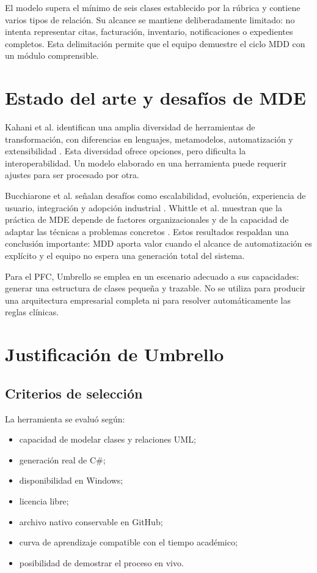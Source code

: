 El modelo supera el mínimo de seis clases establecido por la rúbrica y contiene varios tipos de relación. Su alcance se mantiene deliberadamente limitado: no intenta representar citas, facturación, inventario, notificaciones o expedientes completos. Esta delimitación permite que el equipo demuestre el ciclo MDD con un módulo comprensible.

\section{Estado del arte y desafíos de MDE}
Kahani et al. identifican una amplia diversidad de herramientas de transformación, con diferencias en lenguajes, metamodelos, automatización y extensibilidad \cite{Kahani2019}. Esta diversidad ofrece opciones, pero dificulta la interoperabilidad. Un modelo elaborado en una herramienta puede requerir ajustes para ser procesado por otra.

Bucchiarone et al. señalan desafíos como escalabilidad, evolución, experiencia de usuario, integración y adopción industrial \cite{Bucchiarone2020}. Whittle et al. muestran que la práctica de MDE depende de factores organizacionales y de la capacidad de adaptar las técnicas a problemas concretos \cite{Whittle2014}. Estos resultados respaldan una conclusión importante: MDD aporta valor cuando el alcance de automatización es explícito y el equipo no espera una generación total del sistema.

Para el PFC, Umbrello se emplea en un escenario adecuado a sus capacidades: generar una estructura de clases pequeña y trazable. No se utiliza para producir una arquitectura empresarial completa ni para resolver automáticamente las reglas clínicas.

\section{Justificación de Umbrello}
\subsection{Criterios de selección}
La herramienta se evaluó según:
\begin{itemize}
  \item capacidad de modelar clases y relaciones UML;
  \item generación real de C\#;
  \item disponibilidad en Windows;
  \item licencia libre;
  \item archivo nativo conservable en GitHub;
  \item curva de aprendizaje compatible con el tiempo académico;
  \item posibilidad de demostrar el proceso en vivo.
\end{itemize}

